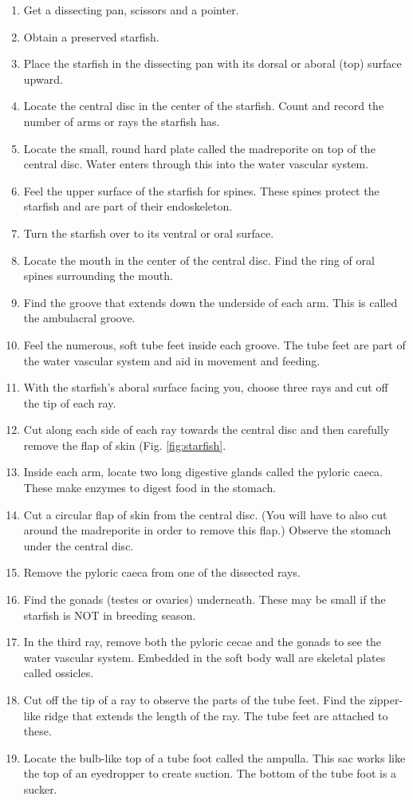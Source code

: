 \documentclass[]{book}
\providecommand{\tightlist}{%
  \setlength{\itemsep}{0pt}\setlength{\parskip}{0pt}}
\begin{document}
\begin{enumerate}
\def\labelenumi{\arabic{enumi}.}
\tightlist
\item
  Get a dissecting pan, scissors and a pointer.
\item
  Obtain a preserved starfish.
\item
  Place the starfish in the dissecting pan with its dorsal or aboral (top) surface upward.
\item
  Locate the central disc in the center of the starfish. Count and record the number of arms or rays the starfish has.
\item
  Locate the small, round hard plate called the madreporite on top of the central disc. Water enters through this into the water vascular system.
\item
  Feel the upper surface of the starfish for spines. These spines protect the starfish and are part of their endoskeleton.
\item
  Turn the starfish over to its ventral or oral surface.
\item
  Locate the mouth in the center of the central disc. Find the ring of oral spines surrounding the mouth.
\item
  Find the groove that extends down the underside of each arm. This is called the ambulacral groove.
\item
  Feel the numerous, soft tube feet inside each groove. The tube feet are part of the water vascular system and aid in movement and feeding.
\item
  With the starfish's aboral surface facing you, choose three rays and cut off the tip of each ray.
\item
  Cut along each side of each ray towards the central disc and then carefully remove the flap of skin (Fig. \ref{fig:starfish}.
\item
  Inside each arm, locate two long digestive glands called the pyloric caeca. These make enzymes to digest food in the stomach.
\item
  Cut a circular flap of skin from the central disc. (You will have to also cut around the madreporite in order to remove this flap.) Observe the stomach under the central disc.
\item
  Remove the pyloric caeca from one of the dissected rays.
\item
  Find the gonads (testes or ovaries) underneath. These may be small if the starfish is NOT in breeding season.
\item
  In the third ray, remove both the pyloric cecae and the gonads to see the water vascular system. Embedded in the soft body wall are skeletal plates called ossicles.
\item
  Cut off the tip of a ray to observe the parts of the tube feet. Find the zipper-like ridge that extends the length of the ray. The tube feet are attached to these.
\item
  Locate the bulb-like top of a tube foot called the ampulla. This sac works like the top of an eyedropper to create suction. The bottom of the tube foot is a sucker.
\end{enumerate}
\end{document}

